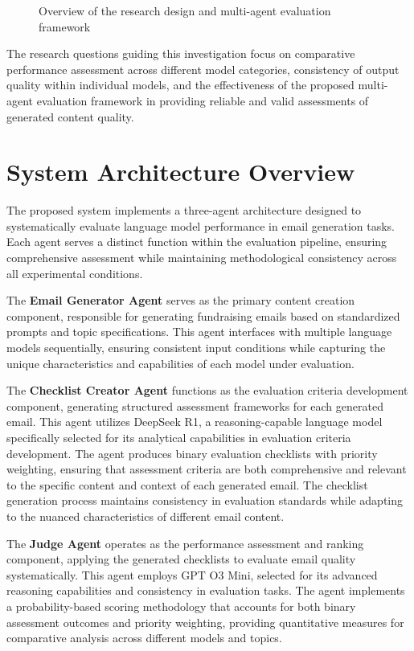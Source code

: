 \begin{figure}[htbp]
    \centering
    \caption{Overview of the research design and multi-agent evaluation framework}
    \label{fig:research-design}
\end{figure}

The research questions guiding this investigation focus on comparative performance assessment across different model categories, consistency of output quality within individual models, and the effectiveness of the proposed multi-agent evaluation framework in providing reliable and valid assessments of generated content quality.

\section{System Architecture Overview}
\label{sec:system-architecture}

The proposed system implements a three-agent architecture designed to systematically evaluate language model performance in email generation tasks. Each agent serves a distinct function within the evaluation pipeline, ensuring comprehensive assessment while maintaining methodological consistency across all experimental conditions.

The \textbf{Email Generator Agent} serves as the primary content creation component, responsible for generating fundraising emails based on standardized prompts and topic specifications. This agent interfaces with multiple language models sequentially, ensuring consistent input conditions while capturing the unique characteristics and capabilities of each model under evaluation.

The \textbf{Checklist Creator Agent} functions as the evaluation criteria development component, generating structured assessment frameworks for each generated email. This agent utilizes DeepSeek R1, a reasoning-capable language model specifically selected for its analytical capabilities in evaluation criteria development. The agent produces binary evaluation checklists with priority weighting, ensuring that assessment criteria are both comprehensive and relevant to the specific content and context of each generated email. The checklist generation process maintains consistency in evaluation standards while adapting to the nuanced characteristics of different email content.

The \textbf{Judge Agent} operates as the performance assessment and ranking component, applying the generated checklists to evaluate email quality systematically. This agent employs GPT O3 Mini, selected for its advanced reasoning capabilities and consistency in evaluation tasks. The agent implements a probability-based scoring methodology that accounts for both binary assessment outcomes and priority weighting, providing quantitative measures for comparative analysis across different models and topics.

